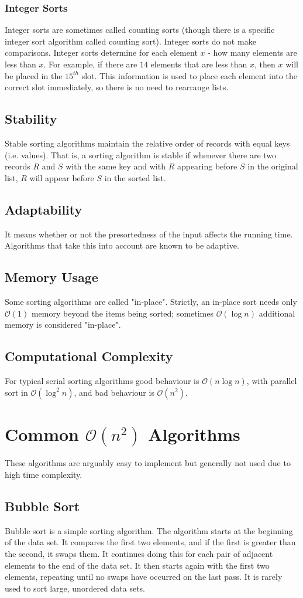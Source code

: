 \documentclass[twoside,12pt,a4paper,english]{book}
\theoremstyle{definition}
\theoremstyle{problemstyle}
\theoremstyle{problemstyle}
\theoremstyle{problemstyle}
\begin{document}
\subsubsection{Integer Sorts}
Integer sorts are sometimes called counting sorts (though there is a specific integer sort algorithm called counting sort). Integer sorts do not make comparisons. Integer sorts determine for each element $x$ - how many elements are less than $x$. For example, if there are $14$ elements that are less than $x$, then $x$ will be placed in the $15^{th}$ slot. This information is used to place each element into the correct slot immediately, so there is no need to rearrange lists.
\subsection{Stability}
Stable sorting algorithms maintain the relative order of records with equal keys (i.e. values). That is, a sorting algorithm is stable if whenever there are two records $R$ and $S$ with the same key and with $R$ appearing before $S$ in the original list, $R$ will appear before $S$ in the sorted list.
\subsection{Adaptability}
It means whether or not the presortedness of the input affects the running time. Algorithms that take this into account are known to be adaptive.
\subsection{Memory Usage}
Some sorting algorithms are called "in-place". Strictly, an in-place sort needs only $\mathcal{O}(1)$ memory beyond the items being sorted; sometimes $\mathcal{O}(\log{n})$ additional memory is considered "in-place".
\subsection{Computational Complexity}
For typical serial sorting algorithms good behaviour is $\mathcal{O}(n\log{n})$, with parallel sort in $\mathcal{O}(\log^{2}{n})$, and bad behaviour is $\mathcal{O}(n^2)$.
\section{Common \texorpdfstring{$\mathcal{O}(n^2)$}{O(n square)} Algorithms}
These algorithms are arguably easy to implement but generally not used due to high time complexity.
\subsection{Bubble Sort}
Bubble sort is a simple sorting algorithm. The algorithm starts at the beginning of the data set. It compares the first two elements, and if the first is greater than the second, it swaps them. It continues doing this for each pair of adjacent elements to the end of the data set. It then starts again with the first two elements, repeating until no swaps have occurred on the last pass. It is rarely used to sort large, unordered data sets.
\end{document}
